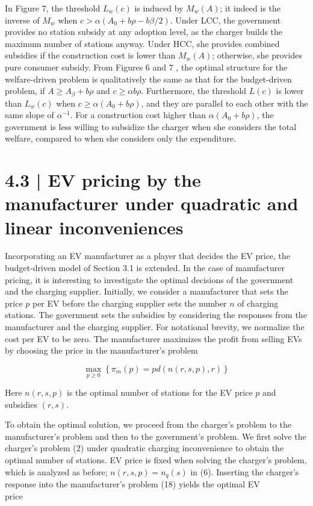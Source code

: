 \documentclass[10pt]{article}
\begin{document}
In Figure 7, the threshold $L_{w}(c)$ is induced by $M_{w}(A)$; it indeed is the inverse of $M_{w}$ when $c>\alpha\left(A_{0}+b \rho-b \beta / 2\right)$. Under LCC, the government provides no station subsidy at any adoption level, as the charger builds the maximum number of stations anyway. Under HCC, she provides combined subsidies if the construction cost is lower than $M_{w}(A)$; otherwise, she provides pure consumer subsidy. From Figures 6 and 7 , the optimal structure for the welfare-driven problem is qualitatively the same as that for the budget-driven problem, if $A \geq A_{\beta}+b \rho$ and $c \geq \alpha b \rho$. Furthermore, the threshold $L(c)$ is lower than $L_{w}(c)$ when $c \geq \alpha\left(A_{0}+b \rho\right)$, and they are parallel to each other with the same slope of $\alpha^{-1}$. For a construction cost higher than $\alpha\left(A_{0}+b \rho\right)$, the government is less willing to subsidize the charger when she considers the total welfare, compared to when she considers only the expenditure.

\section*{4.3 | EV pricing by the manufacturer under quadratic and linear inconveniences}
Incorporating an EV manufacturer as a player that decides the EV price, the budget-driven model of Section 3.1 is extended. In the case of manufacturer pricing, it is interesting to investigate the optimal decisions of the government and the charging supplier. Initially, we consider a manufacturer that sets the price $p$ per EV before the charging supplier sets the number $n$ of charging stations. The government sets the subsidies by considering the responses from the manufacturer and the charging supplier. For notational brevity, we normalize the cost per EV to be zero. The manufacturer maximizes the profit from selling EVs by choosing the price in the manufacturer's problem


\begin{equation*}
\max _{p \geq 0}\left\{\pi_{m}(p)=p d(n(r, s, p), r)\right\} \tag{18}
\end{equation*}


Here $n(r, s, p)$ is the optimal number of stations for the EV price $p$ and subsidies $(r, s)$.

To obtain the optimal solution, we proceed from the charger's problem to the manufacturer's problem and then to the government's problem. We first solve the charger's problem (2) under quadratic charging inconvenience to obtain the optimal number of stations. EV price is fixed when solving the charger's problem, which is analyzed as before; $n(r, s, p)=n_{q}(s)$ in (6). Inserting the charger's response into the manufacturer's problem (18) yields the optimal EV\\
price
\end{document}
